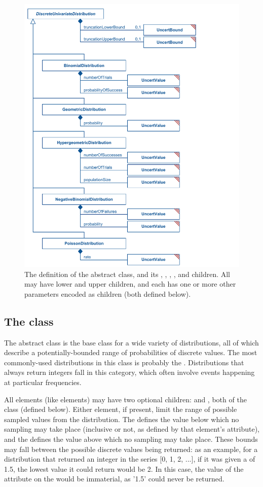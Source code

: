 \begin{figure}[htb]
\includegraphics[width=0.55\linewidth]{figs/discreteUnivariateDistribution.pdf}
\caption{The definition of the \DiscreteUnivariateDistribution abstract class, and its \BinomialDistribution, \GeometricDistribution, \HypergeometricDistribution, \NegativeBinomialDistribution, and \PoissonDistribution children.  All may have lower and upper \UncertBound children, and each has one or more other parameters encoded as \UncertValue children (both defined below).}
\label{fig:discreteUnivariateDistribution}
\end{figure}

\subsection{The  class}
\label{DiscreteUnivariateDistribution-class}
\label{discreteunivariatedistribution-class}

The abstract \DiscreteUnivariateDistribution class is the base class for a wide variety of distributions, all of which describe a potentially-bounded range of probabilities of discrete values.  The most commonly-used distributions in this class is probably the \PoissonDistribution.  Distributions that always return integers fall in this category, which often involve events happening at particular frequencies.

All \DiscreteUnivariateDistribution elements (like \ContinuousUnivariateDistribution elements) may have two optional children:  and , both of the class \UncertBound (defined below).  Either element, if present, limit the range of possible sampled values from the distribution.  The  defines the value below which no sampling may take place
(inclusive or not, as defined by that element's  attribute), and the  defines the value above which no sampling may take place.  These bounds may fall between the possible discrete values being returned:  as an example, for a distribution that returned an integer in the series [0, 1, 2, ...], if it was given a  of 1.5, the lowest value it could return would be 2.  In this case, the value of the  attribute on the \UncertBound would be immaterial, as '1.5' could never be returned.

